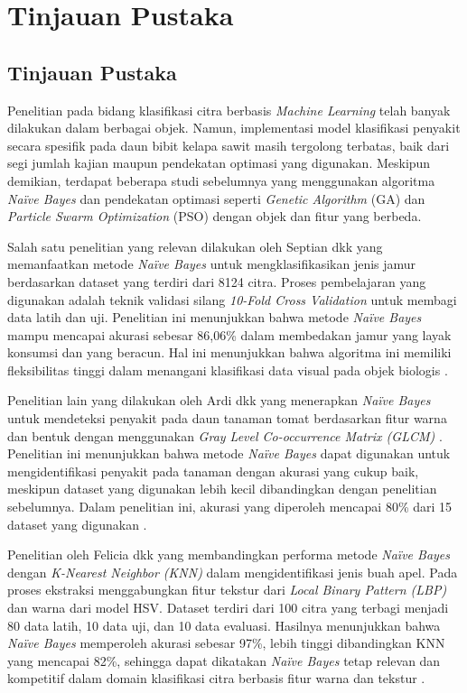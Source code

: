 \newpage
\chapter{Tinjauan Pustaka} \label{Bab II}

\section{Tinjauan Pustaka} \label{II.Tinjauan}
Penelitian pada bidang klasifikasi citra berbasis \textit{Machine Learning} telah banyak dilakukan dalam berbagai objek. Namun, implementasi model klasifikasi penyakit secara spesifik pada daun bibit kelapa sawit masih tergolong terbatas, baik dari segi jumlah kajian maupun pendekatan optimasi yang digunakan. Meskipun demikian, terdapat beberapa studi sebelumnya yang menggunakan algoritma \textit{Naïve Bayes} dan pendekatan optimasi seperti \textit{Genetic Algorithm} (GA) dan \textit{Particle Swarm Optimization} (PSO) dengan objek dan fitur yang berbeda.

Salah satu penelitian yang relevan dilakukan oleh Septian dkk yang memanfaatkan metode \textit{Naïve Bayes} untuk mengklasifikasikan jenis jamur berdasarkan dataset yang terdiri dari 8124 citra. Proses pembelajaran yang digunakan adalah teknik validasi silang \textit{10-Fold Cross Validation} untuk membagi data latih dan uji. Penelitian ini menunjukkan bahwa metode \textit{Naïve Bayes} mampu mencapai akurasi sebesar 86,06\% dalam membedakan jamur yang layak konsumsi dan yang beracun. Hal ini menunjukkan bahwa algoritma ini memiliki fleksibilitas tinggi dalam menangani klasifikasi data visual pada objek biologis \cite{prayoga2019implementasi}.

Penelitian lain yang dilakukan oleh Ardi dkk yang menerapkan \textit{Naïve Bayes} untuk mendeteksi penyakit pada daun tanaman tomat berdasarkan fitur warna dan bentuk dengan menggunakan \textit{Gray Level Co-occurrence Matrix (GLCM)} . Penelitian ini menunjukkan bahwa metode \textit{Naïve Bayes} dapat digunakan untuk mengidentifikasi penyakit pada tanaman dengan akurasi yang cukup baik, meskipun dataset yang digunakan lebih kecil dibandingkan dengan penelitian sebelumnya. Dalam penelitian ini, akurasi yang diperoleh mencapai 80\% dari 15 dataset yang digunakan \cite{nainggolan2022identifikasi}.

Penelitian oleh Felicia dkk yang membandingkan performa metode \textit{Naïve Bayes} dengan \textit{K-Nearest Neighbor (KNN)} dalam mengidentifikasi jenis buah apel. Pada proses ekstraksi menggabungkan fitur tekstur dari \textit{Local Binary Pattern (LBP)} dan warna dari model HSV. Dataset terdiri dari 100 citra yang terbagi menjadi 80 data latih, 10 data uji, dan 10 data evaluasi. Hasilnya menunjukkan bahwa \textit{Naïve Bayes} memperoleh akurasi sebesar 97\%, lebih tinggi dibandingkan KNN yang mencapai 82\%, sehingga dapat dikatakan \textit{Naïve Bayes} tetap relevan dan kompetitif dalam domain klasifikasi citra berbasis fitur warna dan tekstur \cite{febriana2021perbandingan}.

